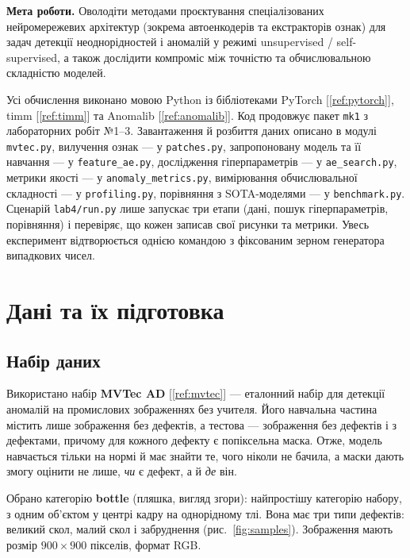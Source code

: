 \documentclass[14pt,a4paper]{extreport}
\begin{document}

\textbf{Мета роботи.} Оволодіти методами проєктування спеціалізованих нейромережевих архітектур (зокрема автоенкодерів та екстракторів ознак) для задач детекції неоднорідностей і аномалій у режимі unsupervised / self-supervised, а також дослідити компроміс між точністю та обчислювальною складністю моделей.

Усі обчислення виконано мовою Python із бібліотеками PyTorch [\ref{ref:pytorch}], timm [\ref{ref:timm}] та Anomalib [\ref{ref:anomalib}]. Код продовжує пакет \texttt{mk1} з лабораторних робіт №1--3. Завантаження й розбиття даних описано в модулі \texttt{mvtec.py}, вилучення ознак --- у \texttt{patches.py}, запропоновану модель та її навчання --- у \texttt{feature\_ae.py}, дослідження гіперпараметрів --- у \texttt{ae\_search.py}, метрики якості --- у \texttt{anomaly\_metrics.py}, вимірювання обчислювальної складності --- у \texttt{profiling.py}, порівняння з SOTA-моделями --- у \texttt{benchmark.py}. Сценарій \texttt{lab4/run.py} лише запускає три етапи (дані, пошук гіперпараметрів, порівняння) і перевіряє, що кожен записав свої рисунки та метрики. Увесь експеримент відтворюється однією командою з фіксованим зерном генератора випадкових чисел.

\section{Дані та їх підготовка}
\label{sec:data}

\subsection{Набір даних}

Використано набір \textbf{MVTec AD} [\ref{ref:mvtec}] --- еталонний набір для детекції аномалій на промислових зображеннях без учителя. Його навчальна частина містить лише зображення без дефектів, а тестова --- зображення без дефектів і з дефектами, причому для кожного дефекту є попіксельна маска. Отже, модель навчається тільки на нормі й має знайти те, чого ніколи не бачила, а маски дають змогу оцінити не лише, \emph{чи} є дефект, а й \emph{де} він.

Обрано категорію \textbf{bottle} (пляшка, вигляд згори): найпростішу категорію набору, з одним об'єктом у центрі кадру на однорідному тлі. Вона має три типи дефектів: великий скол, малий скол і забруднення (рис.~\ref{fig:samples}). Зображення мають розмір $900 \times 900$ пікселів, формат RGB.
\end{document}
